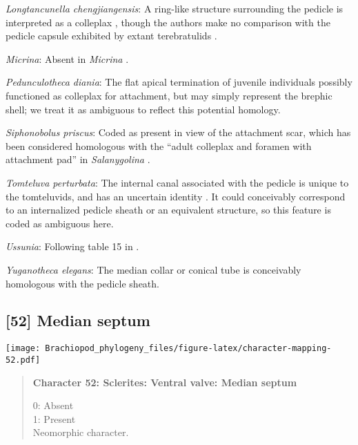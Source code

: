 \documentclass[openany]{book}
\theoremstyle{definition}
\theoremstyle{definition}
\theoremstyle{definition}
\theoremstyle{remark}
\begin{document}
\hypertarget{Longtancunella_chengjiangensis-coding-51}{}
\emph{Longtancunella chengjiangensis}: A ring-like structure surrounding
the pedicle is interpreted as a colleplax
\citep{Zhang2011Theexceptionally}, though the authors make no comparison
with the pedicle capsule exhibited by extant terebratulids
\citep[see][]{Holmer2018Evolutionarysignificance}.

\hypertarget{Micrina-coding-51}{}
\emph{Micrina}: Absent in \emph{Micrina} \citep{Holmer2011Firstrecord}.

\hypertarget{Pedunculotheca_diania-coding-51}{}
\emph{Pedunculotheca diania}: The flat apical termination of juvenile
individuals possibly functioned as colleplax for attachment, but may
simply represent the brephic shell; we treat it as ambiguous to reflect
this potential homology.

\hypertarget{Siphonobolus_priscus-coding-51}{}
\emph{Siphonobolus priscus}: Coded as present in view of the attachment
scar, which has been considered homologous with the ``adult colleplax
and foramen with attachment pad'' in \emph{Salanygolina}
\citep{Popov2009Earlyontogeny}.

\hypertarget{Tomteluva_perturbata-coding-51}{}
\emph{Tomteluva perturbata}: The internal canal associated with the
pedicle is unique to the tomteluvids, and has an uncertain identity
\citep{Streng2016Anew}. It could conceivably correspond to an
internalized pedicle sheath or an equivalent structure, so this feature
is coded as ambiguous here.

\hypertarget{Ussunia-coding-51}{}
\emph{Ussunia}: Following table 15 in
\citet{Williams2000LinguliformeaCraniiformea}.

\hypertarget{Yuganotheca_elegans-coding-51}{}
\emph{Yuganotheca elegans}: The median collar or conical tube is
conceivably homologous with the pedicle sheath.

\subsection*{{[}52{]} Median septum}\label{median-septum}

\texttt{[image: Brachiopod\_phylogeny\_files/figure-latex/character-mapping-52.pdf]}

\begin{quote}
\textbf{Character 52: Sclerites: Ventral valve: Median septum}

0: Absent\\
1: Present\\
Neomorphic character.
\end{quote}
\end{document}

